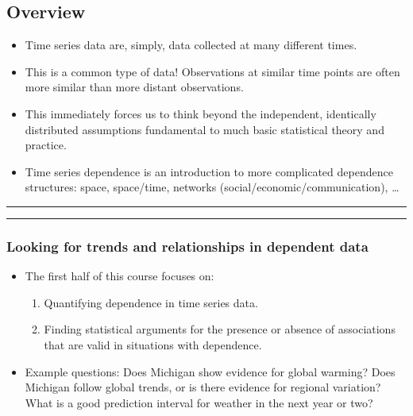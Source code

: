 \documentclass[]{article}
\begin{document}
\subsection{Overview}\label{overview}

\begin{itemize}
\item
  Time series data are, simply, data collected at many different times.
\item
  This is a common type of data! Observations at similar time points are
  often more similar than more distant observations.
\item
  This immediately forces us to think beyond the independent,
  identically distributed assumptions fundamental to much basic
  statistical theory and practice.
\item
  Time series dependence is an introduction to more complicated
  dependence structures: space, space/time, networks
  (social/economic/communication), \ldots{}
\end{itemize}

\begin{center}\rule{0.5\linewidth}{\linethickness}\end{center}

\begin{center}\rule{0.5\linewidth}{\linethickness}\end{center}

\subsubsection{Looking for trends and relationships in dependent
data}\label{looking-for-trends-and-relationships-in-dependent-data}

\begin{itemize}
\item
  The first half of this course focuses on:

  \begin{enumerate}
  \def\labelenumi{\arabic{enumi}.}
  \item
    Quantifying dependence in time series data.
  \item
    Finding statistical arguments for the presence or absence of
    associations that are valid in situations with dependence.
  \end{enumerate}
\item
  Example questions: Does Michigan show evidence for global warming?
  Does Michigan follow global trends, or is there evidence for regional
  variation? What is a good prediction interval for weather in the next
  year or two?
\end{itemize}
\end{document}
